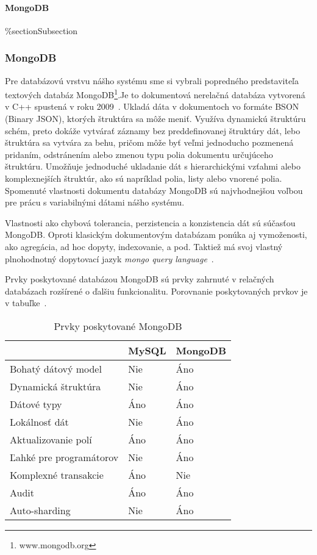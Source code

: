 %
%
{
	\paragraph{MongoDB}
}
{
	\%section{Subsection}
	\subsubsection{MongoDB}
}
\label{subsection:mongodb}
Pre databázovú vrstvu nášho systému sme si vybrali popredného predstaviteľa textových databáz MongoDB\footnote{www.mongodb.org}.Je to dokumentová nerelačná databáza vytvorená v C++ spustená v roku 2009~\cite{NoSQLDBvsRealtionDB}. Ukladá dáta v dokumentoch vo formáte BSON (Binary JSON), ktorých štruktúra sa môže meniť. Využíva dynamickú štruktúru schém, preto dokáže vytvárať záznamy bez preddefinovanej štruktúry dát, lebo štruktúra sa vytvára za behu, pričom môže byť veľmi jednoducho pozmenená pridaním, odstránením alebo zmenou typu polia dokumentu určujúceho štruktúru. Umožňuje jednoduché ukladanie dát s hierarchickými vzťahmi alebo komplexnejších štruktúr, ako sú napríklad polia, listy alebo vnorené polia. Spomenuté vlastnosti dokumentu databázy MongoDB sú najvhodnejšou voľbou pre prácu s variabilnými dátami nášho systému.

Vlastnosti ako chybová tolerancia, perzistencia a konzistencia dát sú súčasťou MongoDB. Oproti klasickým dokumentovým databázam ponúka aj vymoženosti, ako agregácia, ad hoc dopyty, indexovanie, a pod. Taktiež má svoj vlastný plnohodnotný dopytovací jazyk \textit{mongo query language}~\cite{NoSQLDBvsRealtionDB}.

Prvky poskytované databázou MongoDB sú prvky zahrnuté v relačných databázach rozšírené o ďalšiu funkcionalitu. Porovnanie poskytovaných prvkov je v tabuľke~. 

\begin{table}[H]
	\centering
	\caption{Prvky poskytované MongoDB}
	\label{table:features_of_mongodb}
	\begin{tabular}{|l|l|l|}
		\hline
		& \textbf{MySQL} & \textbf{MongoDB} \\ \hline
		Bohatý dátový model & Nie & Áno \\ \hline
		Dynamická štruktúra & Nie & Áno \\ \hline
		Dátové typy & Áno & Áno \\ \hline
		Lokálnosť dát & Nie & Áno \\ \hline
		Aktualizovanie polí & Áno & Áno \\ \hline
		Ľahké pre programátorov & Nie & Áno \\ \hline
		Komplexné transakcie & Áno & Nie \\ \hline
		Audit & Áno & Áno \\ \hline
		Auto-sharding & Nie & Áno \\ \hline
	\end{tabular}
\end{table}

